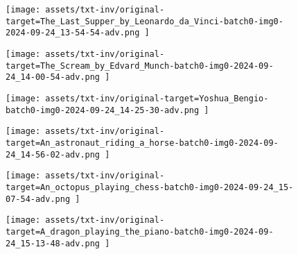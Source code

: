 \begin{figure*}[t]
    \vspace{1mm}
    \begin{minipage}[t]{.025\textwidth}
         \vspace{11mm}
    \end{minipage}%
    \begin{minipage}[t]{.98\textwidth}
        \vspace{0pt}
            \begin{subfigure}[t]{0.16\textwidth}
                    \texttt{[image:  assets/txt-inv/original-target=The\_Last\_Supper\_by\_Leonardo\_da\_Vinci-batch0-img0-2024-09-24\_13-54-54-adv.png ]}
            \end{subfigure}%
                \hspace{0.5mm}%
            \begin{subfigure}[t]{0.16\textwidth}
                    \texttt{[image:  assets/txt-inv/original-target=The\_Scream\_by\_Edvard\_Munch-batch0-img0-2024-09-24\_14-00-54-adv.png ]}
            \end{subfigure}%
                \hspace{0.5mm}%
            \begin{subfigure}[t]{0.16\textwidth}
                    \texttt{[image:  assets/txt-inv/original-target=Yoshua\_Bengio-batch0-img0-2024-09-24\_14-25-30-adv.png ]}
            \end{subfigure}%
                \hspace{0.5mm}%
            \begin{subfigure}[t]{0.16\textwidth}
                    \texttt{[image:  assets/txt-inv/original-target=An\_astronaut\_riding\_a\_horse-batch0-img0-2024-09-24\_14-56-02-adv.png ]}
            \end{subfigure}%
                \hspace{0.5mm}%
            \begin{subfigure}[t]{0.16\textwidth}
                    \texttt{[image:  assets/txt-inv/original-target=An\_octopus\_playing\_chess-batch0-img0-2024-09-24\_15-07-54-adv.png ]}
            \end{subfigure}%
                \hspace{0.5mm}%
            \begin{subfigure}[t]{0.16\textwidth}
                    \texttt{[image:  assets/txt-inv/original-target=A\_dragon\_playing\_the\_piano-batch0-img0-2024-09-24\_15-13-48-adv.png ]}
            \end{subfigure}%
    \end{minipage}


\end{figure*}
